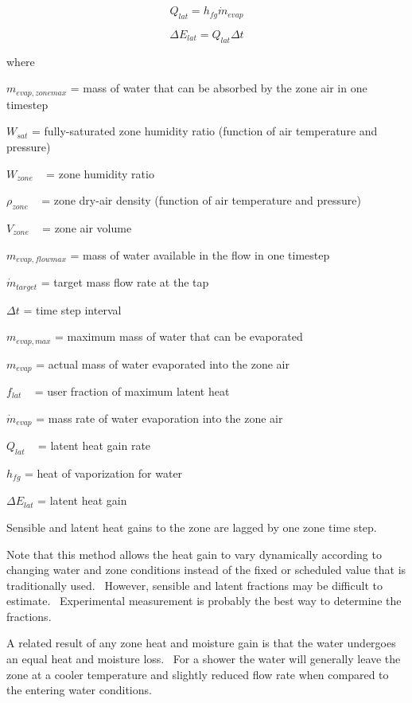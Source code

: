 \begin{equation}
{Q_{lat}} = {h_{fg}}{\dot m_{evap}}
\end{equation}

\begin{equation}
\Delta {E_{lat}} = {Q_{lat}}\Delta t
\end{equation}

where

\({m_{evap,zonemax}}\) = mass of water that can be absorbed by the zone air in one timestep

\({W_{sat}}\) = fully-saturated zone humidity ratio (function of air temperature and pressure)

\({W_{zone}}\) ~ = zone humidity ratio

\({\rho_{zone}}\) ~ = zone dry-air density (function of air temperature and pressure)

\({V_{zone}}\) ~ = zone air volume

\({m_{evap,flowmax}}\) = mass of water available in the flow in one timestep

\({\dot m_{target}}\) = target mass flow rate at the tap

\(\Delta t\) = time step interval

\({m_{evap,max}}\) = maximum mass of water that can be evaporated

\({m_{evap}}\) = actual mass of water evaporated into the zone air

\({f_{lat}}\) ~ = user fraction of maximum latent heat

\({\dot m_{evap}}\) = mass rate of water evaporation into the zone air

\({Q_{lat}}\) ~ = latent heat gain rate

\({h_{fg}}\) = heat of vaporization for water

\(\Delta {E_{lat}}\) = latent heat gain

Sensible and latent heat gains to the zone are lagged by one zone time step.

Note that this method allows the heat gain to vary dynamically according to changing water and zone conditions instead of the fixed or scheduled value that is traditionally used.~ However, sensible and latent fractions may be difficult to estimate.~ Experimental measurement is probably the best way to determine the fractions.

A related result of any zone heat and moisture gain is that the water undergoes an equal heat and moisture loss.~ For a shower the water will generally leave the zone at a cooler temperature and slightly reduced flow rate when compared to the entering water conditions.

